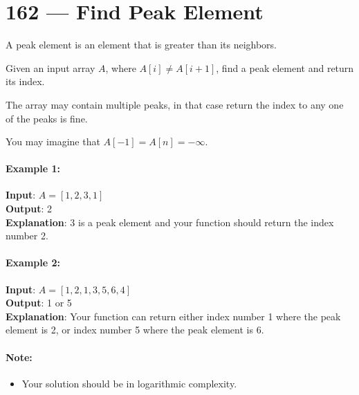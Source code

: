 \section{162 --- Find Peak Element}
A peak element is an element that is greater than its neighbors.
\par
Given an input array $A$, where $A[i] \neq A[i+1]$, find a peak element and return its index.
\par
The array may contain multiple peaks, in that case return the index to any one of the peaks is fine.
\par
You may imagine that $A[-1] = A[n] = -\infty$.
\paragraph{Example 1:}
\begin{flushleft}
\textbf{Input}: $A = [1,2,3,1]$
\\
\textbf{Output}: 2
\\
\textbf{Explanation}: 3 is a peak element and your function should return the index number 2.
\end{flushleft}
\paragraph{Example 2:}
\begin{flushleft}
\textbf{Input}: $A = [1,2,1,3,5,6,4]$
\\
\textbf{Output}: 1 or 5 
\\
\textbf{Explanation}: Your function can return either index number 1 where the peak element is 2, or index number 5 where the peak element is 6.
\end{flushleft}
\paragraph{Note:}
\begin{itemize}
\item Your solution should be in logarithmic complexity.
\end{itemize}
